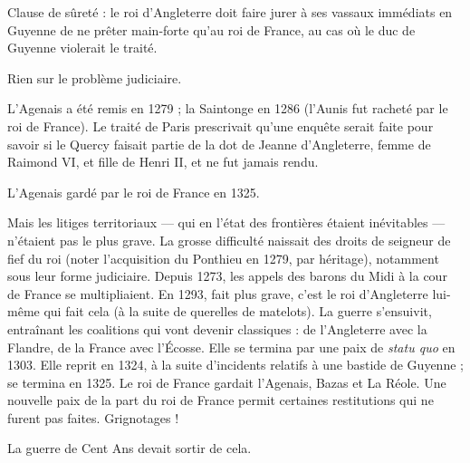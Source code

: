 \documentclass[french,twoside]{book} %
\begin{document}
\begin{listalpha}[itemsep=0pt,]
\item Clause de sûreté : le roi d’Angleterre doit faire jurer à ses vassaux immédiats en Guyenne de ne prêter main-forte qu’au roi de France, au cas où le duc de Guyenne violerait le traité.
\item Rien sur le problème judiciaire.
\item L’Agenais a été remis en 1279 ; la Saintonge en 1286 (l’Aunis fut racheté par le roi de France). Le traité de Paris prescrivait qu’une enquête serait faite pour savoir si le Quercy faisait partie de la dot de Jeanne d’Angleterre, femme de Raimond VI, et fille de Henri II, et ne fut jamais rendu.
\item L’Agenais gardé par le roi de France en 1325.

\end{listalpha}\noindent Mais les litiges territoriaux — qui en l’état des frontières étaient inévitables — n’étaient pas le plus grave. La grosse difficulté naissait des droits de seigneur de fief du roi (noter l’acquisition du Ponthieu en 1279, par héritage), notamment sous leur forme judiciaire. Depuis 1273, les appels des barons du Midi à la cour de France se multipliaient. En 1293, fait plus grave, c’est le roi d’Angleterre lui-même qui fait cela (à la suite de querelles de matelots). La guerre s’ensuivit, entraînant les coalitions qui vont devenir classiques : de l’Angleterre avec la Flandre, de la France avec l’Écosse. Elle se termina par une paix de {\itshape statu quo} en 1303. Elle reprit en 1324, à la suite d’incidents relatifs à une bastide de Guyenne ; se termina en 1325. Le roi de France gardait l’Agenais, Bazas et La Réole. Une nouvelle paix de la part du roi de France permit certaines restitutions qui ne furent pas faites. Grignotages ! \par
La guerre de Cent Ans devait sortir de cela.
\end{document}
